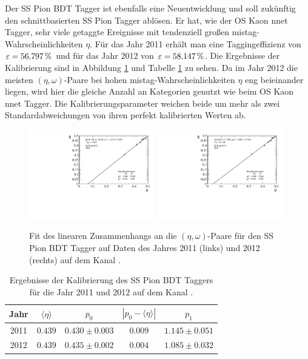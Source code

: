 Der SS Pion BDT Tagger ist ebenfalls eine Neuentwicklung und soll zukünftig den schnittbasierten SS Pion Tagger ablösen. Er hat, wie der OS Kaon nnet Tagger, sehr viele getaggte Ereignisse mit tendenziell großen mistag-Wahrscheinlichkeiten $\eta$. Für das Jahr \num{2011} erhält man eine Taggingeffizienz von $\varepsilon=\SI{56{,}797}{\%}$ und für das Jahr \num{2012} von $\varepsilon=\SI{58{,}147}{\%}$. Die Ergebnisse der Kalibrierung sind in Abbildung \ref{fig:fit_SSPionBDT} und Tabelle \ref{tab:result_SSPionBDT} zu sehen. Da im Jahr \num{2012} die meisten $(\eta,\omega)$-Paare bei hohen mistag-Wahrscheinlichkeiten $\eta$ eng beieinander liegen, wird hier die gleiche Anzahl an Kategorien genutzt wie beim OS Kaon nnet Tagger. Die Kalibrierungsparameter weichen beide um mehr als zwei Standardabweichungen von ihren perfekt kalibrierten Werten ab.
\begin{figure}[htbp]
	\centering
		\includegraphics[width=0.49\textwidth]{fig/2011_SSPionBDT.pdf}
		\includegraphics[width=0.49\textwidth]{fig/2012_SSPionBDT.pdf}
	\caption{Fit des linearen Zusammenhangs an die $(\eta,\omega)$-Paare für den SS Pion BDT Tagger auf Daten des Jahres \num{2011} (links) und \num{2012} (rechts) auf dem Kanal \BdToDpi.}
	\label{fig:fit_SSPionBDT} 
\end{figure}
\begin{table}[htbp]
	\centering
	\caption{Ergebnisse der Kalibrierung des SS Pion BDT Taggers für die Jahr \num{2011} und \num{2012} auf dem Kanal \BdToDpi.}
	\label{tab:result_SSPionBDT}
	\begin{tabular}{ccccc}
	\toprule
       Jahr & $\langle\eta\rangle$ & $p_0$ & $\left|p_0-\langle\eta\rangle\right|$ & $p_1$ \\ 
       \midrule 
	2011 & $0{.}439$ & $0{.}430\pm0{.}003$ & $0{.}009$ & $1{.}145\pm0{.}051$ \\
   	2012 & $0{.}439$ & $0{.}435\pm0{.}002$ & $0{.}004$ & $1{.}085\pm0{.}032$ \\ 
	\bottomrule
  \end{tabular}
\end{table}
